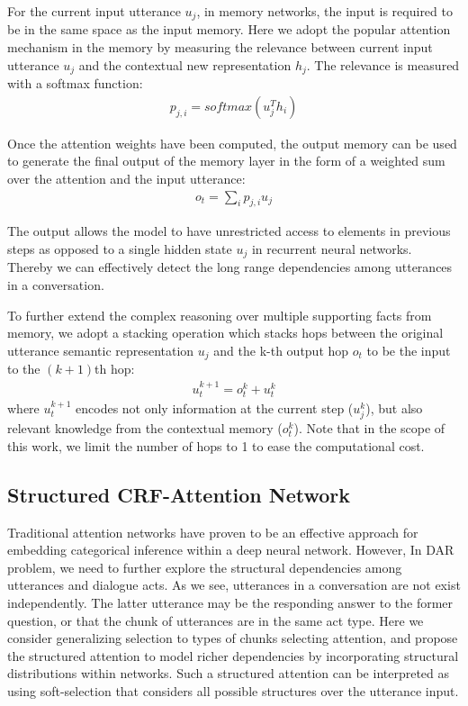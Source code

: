 \documentclass[sigconf]{acmart}
\begin{document}
For the current input utterance $u_j$, in memory networks, the input is required to be in the same space as the input memory. Here we adopt the popular attention mechanism in the memory by measuring the relevance between current input utterance $u_j$ and the contextual new representation $h_j$. The relevance is measured with a softmax function:
\begin{align*}
	p_{j,i}=softmax(u_j^Th_i) \tag{4}
\end{align*}

Once the attention weights have been computed, the output memory can be used to generate the final output of the memory layer in the form of a weighted sum over the attention and the input utterance:
\begin{align*}
	o_t=\sum_i p_{j,i}u_j \tag{5}
\end{align*}

The output allows the model to have unrestricted access to elements in previous steps as opposed to a single hidden state $u_j$ in recurrent neural networks. Thereby we can effectively detect the long range dependencies among utterances in a conversation.

To further extend the complex reasoning over multiple supporting facts from memory, we adopt a stacking operation which stacks hops between the original utterance semantic representation $u_j$ and the k-th output hop $o_t$ to be the input to the $(k+1)$th hop:
\begin{align*}
	u_t^{k+1}=o_t^k+u_t^k \tag{6}
\end{align*} 
where $u_t^{k+1}$ encodes not only information at the current step ($u_j^k$), but also relevant knowledge from the contextual memory ($o_t^k$). Note that in the scope of this work, we limit the number of hops to 1 to ease the computational cost.

\subsection{Structured CRF-Attention Network}
Traditional attention networks have proven to be an effective approach for embedding categorical inference within a deep neural network. However, In DAR problem, we need to further explore the 
structural dependencies among utterances and dialogue acts. As we see, utterances in a conversation are not exist independently. The latter utterance may be the responding answer to the former question, or that the chunk of utterances are in the same act type. Here we consider generalizing selection to types of chunks selecting attention, and propose the structured attention to model richer dependencies by incorporating structural distributions within networks. Such a structured attention can be interpreted as using soft-selection that considers all possible structures over the utterance input. 
\end{document}
